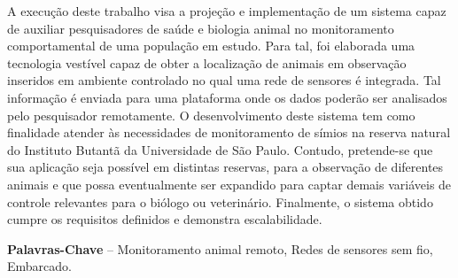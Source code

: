 \begin{resumo}
A execução deste trabalho visa a projeção e implementação de um sistema capaz de auxiliar pesquisadores de saúde e biologia animal no monitoramento comportamental de uma população em estudo. Para tal, foi elaborada uma tecnologia vestível capaz de obter a localização de animais em observação inseridos em ambiente controlado no qual uma rede de sensores é integrada. Tal informação é enviada para uma plataforma onde os dados poderão ser analisados pelo pesquisador remotamente. O desenvolvimento deste sistema tem como finalidade atender às necessidades de monitoramento de símios na reserva natural do Instituto Butantã da Universidade de São Paulo. Contudo, pretende-se que sua aplicação seja possível em distintas reservas, para a observação de diferentes animais e que possa eventualmente ser expandido para captar demais variáveis de controle relevantes para o biólogo ou veterinário. Finalmente, o sistema obtido cumpre os requisitos definidos e demonstra escalabilidade.

\textbf{Palavras-Chave} -- Monitoramento animal remoto, Redes de sensores sem fio, Embarcado.
\end{resumo}
